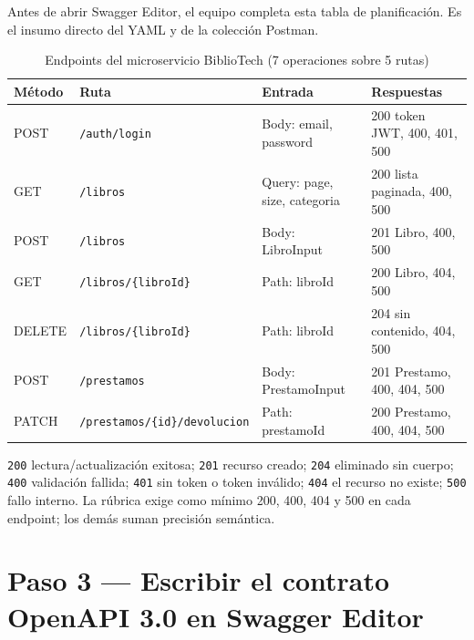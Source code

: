 \documentclass[11pt,a4paper]{article}
\begin{document}
Antes de abrir Swagger Editor, el equipo completa esta tabla de planificación. Es el insumo directo del YAML y de la colección Postman.

\begin{table}[h!]
\centering
\caption{Endpoints del microservicio BiblioTech (7 operaciones sobre 5 rutas)}
\small
\begin{tabular}{l l p{4.0cm} p{5.0cm}}
\toprule
\textbf{Método} & \textbf{Ruta} & \textbf{Entrada} & \textbf{Respuestas} \\
\midrule
POST & \texttt{/auth/login} & Body: email, password & 200 token JWT, 400, 401, 500 \\
GET & \texttt{/libros} & Query: page, size, categoria & 200 lista paginada, 400, 500 \\
POST & \texttt{/libros} & Body: LibroInput & 201 Libro, 400, 500 \\
GET & \texttt{/libros/\{libroId\}} & Path: libroId & 200 Libro, 404, 500 \\
DELETE & \texttt{/libros/\{libroId\}} & Path: libroId & 204 sin contenido, 404, 500 \\
POST & \texttt{/prestamos} & Body: PrestamoInput & 201 Prestamo, 400, 404, 500 \\
PATCH & \texttt{/prestamos/\{id\}/devolucion} & Path: prestamoId & 200 Prestamo, 400, 404, 500 \\
\bottomrule
\end{tabular}
\end{table}

\begin{cajanota}
\texttt{200} lectura/actualización exitosa; \texttt{201} recurso creado; \texttt{204} eliminado sin cuerpo; \texttt{400} validación fallida; \texttt{401} sin token o token inválido; \texttt{404} el recurso no existe; \texttt{500} fallo interno. La rúbrica exige como mínimo 200, 400, 404 y 500 en cada endpoint; los demás suman precisión semántica.
\end{cajanota}

\section{Paso 3 --- Escribir el contrato OpenAPI 3.0 en Swagger Editor}
\end{document}
